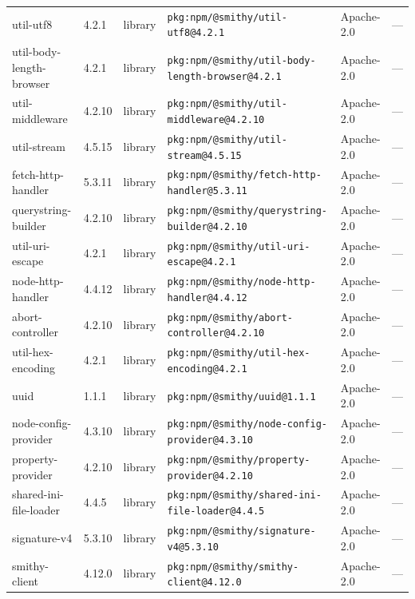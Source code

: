 \documentclass[11pt,a4paper]{article}
\begin{document}
\begin{longtable}{|p{4cm}|p{2cm}|p{1.6cm}|p{5cm}|p{1.5cm}|p{3.5cm}|}
\raggedright util-utf8 & 4.2.1 & library & \small\texttt{pkg:npm/@smithy/util-utf8@4.2.1} & Apache-2.0 & \small — \\
\raggedright util-body-length-browser & 4.2.1 & library & \small\texttt{pkg:npm/@smithy/util-body-length-browser@4.2.1} & Apache-2.0 & \small — \\
\raggedright util-middleware & 4.2.10 & library & \small\texttt{pkg:npm/@smithy/util-middleware@4.2.10} & Apache-2.0 & \small — \\
\raggedright util-stream & 4.5.15 & library & \small\texttt{pkg:npm/@smithy/util-stream@4.5.15} & Apache-2.0 & \small — \\
\raggedright fetch-http-handler & 5.3.11 & library & \small\texttt{pkg:npm/@smithy/fetch-http-handler@5.3.11} & Apache-2.0 & \small — \\
\raggedright querystring-builder & 4.2.10 & library & \small\texttt{pkg:npm/@smithy/querystring-builder@4.2.10} & Apache-2.0 & \small — \\
\raggedright util-uri-escape & 4.2.1 & library & \small\texttt{pkg:npm/@smithy/util-uri-escape@4.2.1} & Apache-2.0 & \small — \\
\raggedright node-http-handler & 4.4.12 & library & \small\texttt{pkg:npm/@smithy/node-http-handler@4.4.12} & Apache-2.0 & \small — \\
\raggedright abort-controller & 4.2.10 & library & \small\texttt{pkg:npm/@smithy/abort-controller@4.2.10} & Apache-2.0 & \small — \\
\raggedright util-hex-encoding & 4.2.1 & library & \small\texttt{pkg:npm/@smithy/util-hex-encoding@4.2.1} & Apache-2.0 & \small — \\
\raggedright uuid & 1.1.1 & library & \small\texttt{pkg:npm/@smithy/uuid@1.1.1} & Apache-2.0 & \small — \\
\raggedright node-config-provider & 4.3.10 & library & \small\texttt{pkg:npm/@smithy/node-config-provider@4.3.10} & Apache-2.0 & \small — \\
\raggedright property-provider & 4.2.10 & library & \small\texttt{pkg:npm/@smithy/property-provider@4.2.10} & Apache-2.0 & \small — \\
\raggedright shared-ini-file-loader & 4.4.5 & library & \small\texttt{pkg:npm/@smithy/shared-ini-file-loader@4.4.5} & Apache-2.0 & \small — \\
\raggedright signature-v4 & 5.3.10 & library & \small\texttt{pkg:npm/@smithy/signature-v4@5.3.10} & Apache-2.0 & \small — \\
\raggedright smithy-client & 4.12.0 & library & \small\texttt{pkg:npm/@smithy/smithy-client@4.12.0} & Apache-2.0 & \small — \\

\end{longtable}
\end{document}
